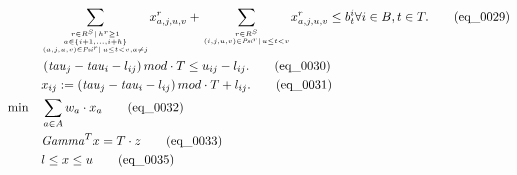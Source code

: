 \begin{align}
  & \underset{\genfrac{}{}{0pt}{}{\genfrac{}{}{0pt}{}{r \in R^{S} \left|\right. h^{r} \geq 1}{a \in \left\{i + 1 , \ldots , i + h\right\}}}{\left(a , j , u , v\right) \in \mathit{Psi}^{r} \left|\right. u \leq t < v , a \neq j}}{\sum} x_{a , j , u , v}^{r} + \underset{\genfrac{}{}{0pt}{}{r \in R^{S}}{\left(i , j , u , v\right) \in \mathit{Psi}^{r} \left|\right. u \leq t < v}}{\sum} x_{a , j , u , v}^{r} \leq b_{t}^{i} \forall i \in B , t \in T . \tag{eq\_0029} \\
  & \left(\mathit{tau}_{j} - \mathit{tau}_{i} - l_{i j}\right) mod \cdot T \leq u_{i j} - l_{i j} . \tag{eq\_0030} \\
  & x_{i j} := \left(\mathit{tau}_{j} - \mathit{tau}_{i} - l_{i j}\right) mod \cdot T + l_{i j} . \tag{eq\_0031} \\
  \min\quad & \sum_{a \in A} w_{a} \cdot x_{a} \tag{eq\_0032} \\
  & \mathit{Gamma}^{T} x = T \cdot z \tag{eq\_0033} \\
  & l \leq x \leq u \tag{eq\_0035} \\
\end{align}
